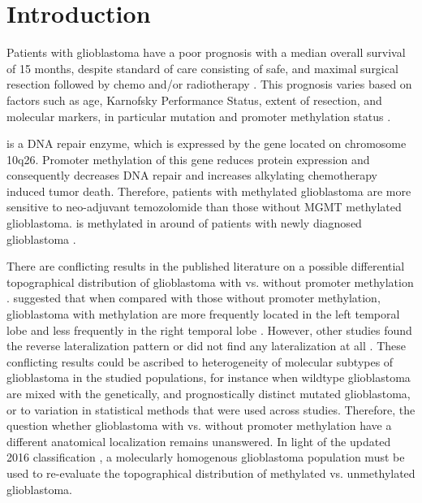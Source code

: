 \section{Introduction}

Patients with glioblastoma have a poor prognosis with a median overall survival of 15 months, despite standard of care consisting of safe, and maximal surgical resection followed by chemo and/or radiotherapy \autocite{stupp2005radiotherapy}.
This prognosis varies based on factors such as age, Karnofsky Performance Status, extent of resection, and molecular markers, in particular  mutation and  promoter methylation status \autocite{gessler2018surgery}.

 is a DNA repair enzyme, which is expressed by the  gene located on chromosome 10q26.
Promoter methylation of this gene reduces  protein expression and consequently decreases DNA repair and increases alkylating chemotherapy induced tumor death.
Therefore, patients with  methylated glioblastoma are more sensitive to neo-adjuvant temozolomide than those without MGMT methylated glioblastoma.
 is methylated in around  of patients with newly diagnosed glioblastoma \autocite{hegi2005MGMT}.

There are conflicting results in the published literature on a possible differential topographical distribution of glioblastoma with vs. without  promoter methylation \autocite{smits2017imaging}.
 suggested that when compared with those without  promoter methylation, glioblastoma with methylation are more frequently located in the left temporal lobe and less frequently in the right temporal lobe \autocite{ellingson2012anatomic}.
However, other studies found the reverse lateralization pattern \autocite{wang2014anatomical} or did not find any lateralization at all \autocite{carillo2012relationship, eoli2007methylation, han2018structural}.
These conflicting results could be ascribed to heterogeneity of molecular subtypes of glioblastoma in the studied populations, for instance when  wildtype glioblastoma are mixed with the genetically, and prognostically distinct  mutated glioblastoma, or to variation in statistical methods that were used across studies.
Therefore, the question whether glioblastoma with vs. without  promoter methylation have a different anatomical localization remains unanswered.
In light of the updated  2016 classification \autocite{louis20162016}, a molecularly homogenous glioblastoma population must be used to re-evaluate the topographical distribution of  methylated vs. unmethylated glioblastoma.


